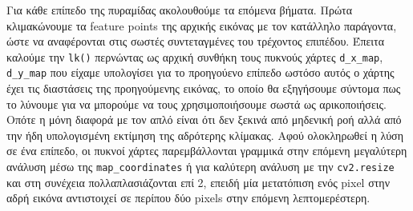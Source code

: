 \documentclass[12pt, a4paper]{article}
\begin{document}
Για κάθε επίπεδο της πυραμίδας ακολουθούμε τα επόμενα βήματα.
Πρώτα κλιμακώνουμε τα feature points της αρχικής εικόνας με τον κατάλληλο παράγοντα, ώστε να αναφέρονται στις σωστές συντεταγμένες του τρέχοντος επιπέδου. Έπειτα καλούμε την \texttt{lk()} περνώντας ως αρχική συνθήκη τους πυκνούς χάρτες \texttt{d\_x\_map}, \texttt{d\_y\_map} που είχαμε υπολογίσει για το προηγούενο επίπεδο ωστόσο αυτός ο χάρτης έχει τις διαστάσεις της προηγούμενης εικόνας, το οποίο θα εξηγήσουμε σύντομα πως το λύνουμε για να μπορούμε να τους χρησιμοποιήσουμε σωστά ως αρικοποιήσεις. 
Οπότε η μόνη διαφορά με τον απλό είναι ότι δεν ξεκινά από μηδενική ροή αλλά από την ήδη υπολογισμένη εκτίμηση της αδρότερης κλίμακας. Αφού ολοκληρωθεί η λύση σε ένα επίπεδο, οι πυκνοί χάρτες παρεμβάλλονται γραμμικά στην επόμενη μεγαλύτερη ανάλυση μέσω της \texttt{map\_coordinates}  ή για καλύτερη ανάλυση με την
\texttt{cv2.resize}  και στη συνέχεια πολλαπλασιάζονται επί 2, επειδή μία μετατόπιση ενός pixel στην αδρή εικόνα αντιστοιχεί σε περίπου δύο pixels στην επόμενη λεπτομερέστερη.
\end{document}
